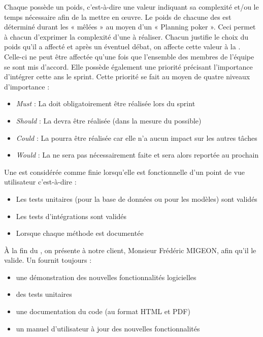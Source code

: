 Chaque \story{} possède un poids, c'est-à-dire une valeur indiquant sa complexité et/ou le temps nécessaire afin de la mettre en œuvre. Le poids de
chacune des \story{} est déterminé durant les « mêlées » au moyen d’un « Planning poker ». Ceci permet à chacun d’exprimer la complexité d’une
\story{} à réaliser. Chacun justifie le choix du poids qu'il a affecté et après un éventuel débat, on affecte cette valeur à la \story{}. Celle-ci ne
peut être affectée qu'une fois que l'ensemble des membres de l'équipe se sont mis d’accord. Elle possède également une priorité précisant
l'importance d’intégrer cette \story{} ans le sprint. Cette priorité se fait au moyen de quatre niveaux d’importance : 

\begin{itemize}
	\item \textit{Must} : La \story{} doit obligatoirement être réalisée lors du sprint
	\item \textit{Should} : La \story{} devra être réalisée (dans la mesure du possible)
	\item \textit{Could} : La \story{} pourra être réalisée car elle n’a aucun impact sur les autres tâches
	\item \textit{Would} : La \story{} ne sera pas nécessairement faite et sera alors reportée au prochain \sprint{}
\end{itemize}

Une  \story{} est considérée comme finie lorsqu'elle est fonctionnelle d’un point de vue utilisateur c'est-à-dire :
\begin{itemize}
	\item Les tests unitaires (pour la base de données ou pour les modèles) sont validés
	\item Les tests d’intégrations sont validés
	\item Lorsque chaque méthode est documentée
\end{itemize}

À la fin du \sprint{}, on présente à notre client, Monsieur Frédéric MIGEON, afin qu'il le valide. Un \sprint{} fournit toujours :
\begin{itemize}
	\item une démonstration des nouvelles fonctionnalités logicielles
	\item des tests unitaires
	\item une documentation du code (au format HTML et PDF)
	\item un manuel d’utilisateur à jour des nouvelles fonctionnalités
\end{itemize}

